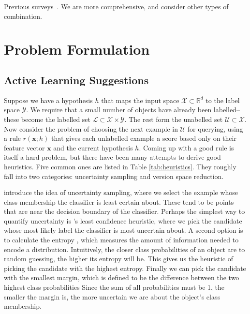\documentclass[fleqn,10pt,lineno]{wlpeerj} %
\newcommand{\X}{\mathcal{X}}
\newcommand{\Y}{\mathcal{Y}}
\newcommand{\Unlabelled}{\mathcal{U}}
\newcommand{\Labelled}{\mathcal{L}}
\begin{document}
Previous surveys~\cite{baram04, hsu15}.
We are more comprehensive, and consider other types of combination.

\section*{Problem Formulation}

\subsection*{Active Learning Suggestions}

Suppose we have a hypothesis $h$ that maps the input space $\X \subset \mathbb{R}^d$
to the label space $\Y$. We require that a small number of objects have already
been labelled--these become the labelled set $\Labelled \subset \X \times \Y$.
The rest form the unabelled set
$\Unlabelled \subset \X$. Now consider the problem of choosing the next example
in $\Unlabelled$ for querying, using a rule
$r(\bm{x}; h)$ that gives each unlabelled example a score based only on
their feature vector $\bm{x}$ and the current hypothesis $h$. Coming up with a good
rule is itself a hard problem, but there have been many attempts to derive
good heuristics.
Five common ones are listed in Table \ref{tab:heuristics}.
They roughly fall into two categories: uncertainty sampling and version space
reduction.

\cite{lewis94} introduce the idea of uncertainty sampling, where we select the example whose class
membership the classifier is least certain about. These tend to be points that are near the
decision boundary of the classifier. Perhaps the simplest way to quantify uncertainty is \cite{culotta05}'s least confidence heuristic, where we pick the candidate whose most likely label the classifier is most uncertain about. A second option is to calculate the
entropy \citep{shannon48}, which measures the amount of information needed to encode a distribution.
Intuitively, the closer class probabilities of an object are to random guessing, the higher its
entropy will be. This gives us the heuristic of picking the candidate with the highest entropy.
Finally we can pick the candidate with the smallest margin, which is defined to be the difference between the two highest class probabilities \citep{scheffer01} Since the sum of all probabilities must be 1, the smaller the margin is, the more uncertain we are about the object's class membership.
\end{document}
